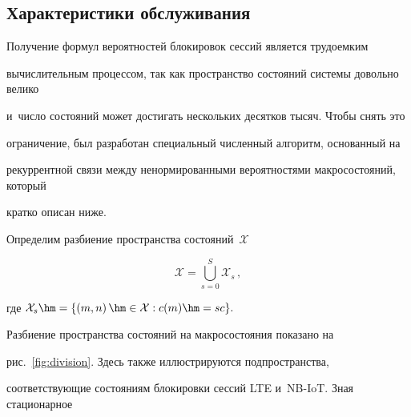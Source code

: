\vspace*{-6pt}





\subsection{Характеристики обслуживания}





\vspace*{-2pt}





Получение формул вероятностей блокировок сессий является трудоемким 


вычислительным процессом, так как пространство состояний системы довольно велико 


и~число состояний может достигать нескольких десятков тысяч. Чтобы снять это 


ограничение, был разработан специальный численный алгоритм, основанный на 


рекуррентной связи между ненормированными вероятностями макросостояний, который 


кратко описан ниже.





Определим разбиение пространства состояний~$\mathcal{X}$


\begin{equation}


\label{eqn:division}


    \mathcal{X}=\bigcup\limits_{s = 0}^S{\mathcal {X}_s}\,,


\end{equation}


где  $\mathcal {X}_{s}\hm=\{ {\left( {m,n} \right) 


\hm\in \mathcal {X}:c(m) \hm= sc}\}.$





\pagebreak





Разбиение пространства состояний на макросостояния показано на 


рис.~\ref{fig:division}. Здесь также иллюстрируются подпространства, 


соответствующие состояниям блокировки сессий LTE и~NB-IoT. Зная стационарное 


